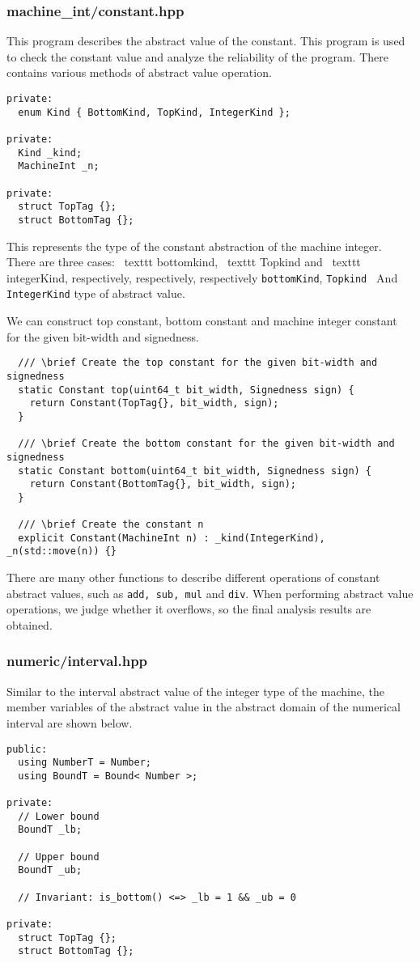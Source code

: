 \documentclass[12pt]{article}
\begin{document}
\subsubsection{machine\_int/constant.hpp}
This program describes the abstract value of the constant. This program is used to check the constant value and analyze the reliability of the program. There contains various methods of abstract value operation.
\begin{lstlisting}
private:
  enum Kind { BottomKind, TopKind, IntegerKind };

private:
  Kind _kind;
  MachineInt _n;

private:
  struct TopTag {};
  struct BottomTag {};
\end{lstlisting}
This represents the type of the constant abstraction of the machine integer. There are three cases: \ texttt {bottomkind}, \ texttt {Topkind} and \ texttt {integerKind}, respectively, respectively, respectively \texttt {bottomKind}, \texttt {Topkind } And \texttt {IntegerKind} type of abstract value.

We can construct top constant, bottom constant and machine integer constant for the given bit-width and signedness. 
\begin{lstlisting}
  /// \brief Create the top constant for the given bit-width and signedness
  static Constant top(uint64_t bit_width, Signedness sign) {
    return Constant(TopTag{}, bit_width, sign);
  }

  /// \brief Create the bottom constant for the given bit-width and signedness
  static Constant bottom(uint64_t bit_width, Signedness sign) {
    return Constant(BottomTag{}, bit_width, sign);
  }

  /// \brief Create the constant n
  explicit Constant(MachineInt n) : _kind(IntegerKind), _n(std::move(n)) {}
\end{lstlisting}

There are many other functions to describe different operations of constant abstract values, such as \texttt{add, sub, mul} and \texttt{div}. When performing abstract value operations, we judge whether it overflows, so the final analysis results are obtained.

\subsubsection{numeric/interval.hpp}
Similar to the interval abstract value of the integer type of the machine, the member variables of the abstract value in the abstract domain of the numerical interval are shown below.
\begin{lstlisting}
public:
  using NumberT = Number;
  using BoundT = Bound< Number >;

private:
  // Lower bound
  BoundT _lb;

  // Upper bound
  BoundT _ub;

  // Invariant: is_bottom() <=> _lb = 1 && _ub = 0

private:
  struct TopTag {};
  struct BottomTag {};
\end{lstlisting}
\end{document}
